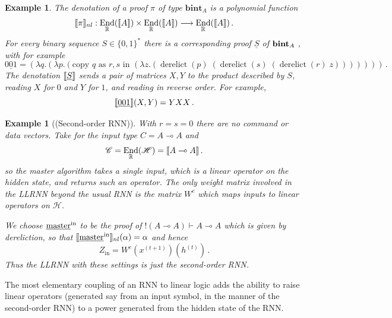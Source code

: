 \documentclass[english,letter paper,12pt,leqno]{article}
\theoremstyle{example}
\newtheorem{example}[theorem]{Example}
\numberwithin{equation}{section}
\def\be{\begin{equation}}
\def\ee{\end{equation}}
\DeclareMathOperator{\End}{End}
\DeclareMathOperator{\derelict}{derelict}
\begin{document}
\begin{example}\label{example_2} The denotation of a proof $\pi$ of type $\textbf{bint}_A$ is a polynomial function
\[
\den{\pi}_{nl}: \End_{\mathbb{R}}(\den{A}) \times \End_{\mathbb{R}}(\den{A}) \lto \End_{\mathbb{R}}(\den{A})\,.
\]
For every binary sequence $S \in \{0,1\}^*$ there is a corresponding proof $\underline{S}$ of $\textbf{bint}_A$ \cite[\S 3.2]{murfetclift}, with for example
\[
\underline{001} = (\lambda q.(\lambda p.(\textrm{copy $q$ as $r,s$ in } (\lambda z.(\derelict(p)\;(\derelict(s)\;(\derelict(r)\;z)))))))\,.
\]
The denotation $\llbracket \underline{S} \rrbracket$ sends a pair of matrices $X,Y$ to the product described by $S$, reading $X$ for $0$ and $Y$ for $1$, and reading in reverse order. For example,
\[
\llbracket \underline{001} \rrbracket(X,Y) = Y X X\,.
\]
\end{example}

\begin{example}[(Second-order RNN)] With $r = s = 0$ there are no command or data vectors. Take for the input type $C = A \multimap A$ and
\[
\mathscr{C} = \End_{\mathbb{R}}(\mathscr{H}) = \den{A \multimap A}\,.
\]
so the master algorithm takes a single input, which is a linear operator on the hidden state, and returns such an operator. The only weight matrix involved in the LLRNN beyond the usual RNN is the matrix $W^c$ which maps inputs to linear operators on $\mathscr{H}$.

We choose $\underline{\textup{master}}^{\mathrm{in}}$ to be the proof of ${!}(A \multimap A) \vdash A \multimap A$ which is given by dereliction, so that $\llbracket \underline{\textup{master}}^{\mathrm{in}} \rrbracket_{nl}(\alpha) = \alpha$ and hence
\be\label{eq:secondorderRNNinLLRNN}
Z_{\mathrm{in}} = W^c(x^{(t+1)})(h^{(t)})\,.
\ee
Thus the LLRNN with these settings is just the second-order RNN.
\end{example}

The most elementary coupling of an RNN to linear logic adds the ability to raise linear operators (generated say from an input symbol, in the manner of the second-order RNN) to a power generated from the hidden state of the RNN. 
\end{document}

